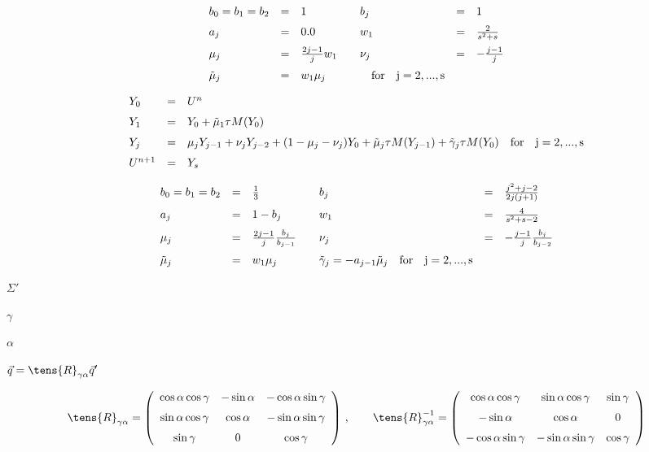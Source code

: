 \documentclass{article}
\begin{document}
\[ \begin{array}{lclclcl}
    b_0 = b_1 = b_2 & = & 1 & &
    b_j & = & 1 \\ \noalign{\medskip}
    a_j & = & 0.0 & & w_1 & = & \frac{2}{s^2 + s} \\ \noalign{\medskip}
    \mu_j & = & \frac{2j - 1}{j} w_1 & &
    \nu_j & = & -\frac{j-1}{j} \\ \noalign{\medskip}
    \tilde{\mu}_j & = & w_1 \mu_j & & 
            \quad \rm{for} \quad j = 2,...,s   
    \end{array}
\]
\pagebreak

\[ \begin{array}{lcl}
    Y_0 & = & U^n                            \\ \noalign{\medskip}
    Y_1 & = & Y_0 + \tilde{\mu}_1\tau M(Y_0) \\ \noalign{\medskip}
    Y_j & = & \mu_j Y_{j-1} + \nu_j Y_{j-2} + (1 - \mu_j - \nu_j) Y_0
          + \tilde{\mu}_j \tau M(Y_{j-1}) + \tilde{\gamma}_j \tau M(Y_0)
          \quad \rm{for} \quad j = 2,...,s   \\ \noalign{\medskip}
    U^{n+1} & = & Y_s
    \end{array}
\]
\pagebreak

\[ \begin{array}{lclclcl}
    b_0 = b_1 = b_2 & = & \frac{1}{3} & &
            b_j & = & \frac{j^2 + j - 2}{2j(j + 1)} \\ \noalign{\medskip}
    a_j & = & 1 - b_j & & w_1 & = & \frac{4}{s^2 + s - 2} \\ \noalign{\medskip}
    \mu_j & = & \frac{2j - 1}{j} \frac{b_j}{b_{j-1}} & &
            \nu_j & = & -\frac{j-1}{j} \frac{b_j}{b_{j-2}} \\ \noalign{\medskip}
    \tilde{\mu}_j & = & w_1 \mu_j & & \tilde{\gamma}_j = -a_{j-1}\tilde{\mu}_j
            \quad \rm{for} \quad j = 2,...,s   
    \end{array}
\]
\pagebreak

$\Sigma'$
\pagebreak

$\gamma $
\pagebreak

$\alpha$
\pagebreak

$\vec{q} = \tens{R}_{\gamma\alpha}\vec{q}'$
\pagebreak

\[  \tens{R}_{\gamma\alpha} = \left(\begin{array}{ccc}
     \cos\alpha\cos\gamma  &   -\sin\alpha  &   -\cos\alpha\sin\gamma
     \\ \noalign{\medskip}
     \sin\alpha\cos\gamma  &    \cos\alpha  &   -\sin\alpha\sin\gamma
     \\ \noalign{\medskip}
     \sin\gamma            &       0        &   \cos\gamma
  \end{array}\right)
  \,,\qquad
  \tens{R}^{-1}_{\gamma\alpha} = \left(\begin{array}{ccc}
     \cos\alpha\cos\gamma  &  \sin\alpha\cos\gamma  &  \sin\gamma
     \\ \noalign{\medskip}
      -\sin\alpha          &   \cos\alpha           &    0
     \\ \noalign{\medskip}
     -\cos\alpha\sin\gamma &  -\sin\alpha\sin\gamma  &  \cos\gamma
    \end{array}\right)
\]
\pagebreak
\end{document}

